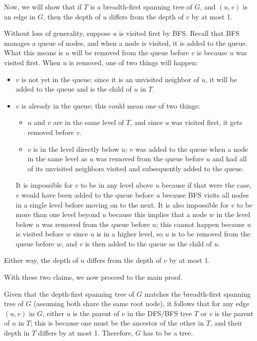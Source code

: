 \documentclass{article}
\begin{document}
\begin{enumerate}
Now, we will show that if $T$ is a breadth-first spanning tree of $G$, and $(u, v)$ is an edge in $G$, then the depth of $u$ differs from the depth of $v$ by at most 1.

Without loss of generality, suppose $u$ is visited first by BFS. Recall that BFS manages a queue of nodes, and when a node is visited, it is added to the queue. What this means is $u$ will be removed from the queue before $v$ is because $u$ was visited first. When $u$ is removed, one of two things will happen:
\begin{itemize}
\item $v$ is not yet in the queue; since it is an unvisited neighbor of $u$, it will be added to the queue and is the child of $u$ in $T$.
\item $v$ is already in the queue; this could mean one of two things:
\begin{itemize}
\item $u$ and $v$ are in the same level of $T$, and since $u$ was visited first, it gets removed before $v$.
\item $v$ is in the level directly below $u$; $v$ was added to the queue when a node in the same level as $u$ was removed from the queue before $u$ and had all of its unvisited neighbors visited and subsequently added to the queue.
\end{itemize}
It is impossible for $v$ to be in any level above $u$ because if that were the case, $v$ would have been added to the queue before $u$ because BFS visits all nodes in a single level before moving on to the next. It is also impossible for $v$ to be more than one level beyond $u$ because this implies that a node $w$ in the level below $u$ was removed from the queue before $u$; this cannot happen because $u$ is visited before $w$ since $u$ is in a higher level, so $u$ is to be removed from the queue before $w$, and $v$ is then added to the queue as the child of $u$.
\end{itemize}
Either way, the depth of $u$ differs from the depth of $v$ by at most 1.

With these two claims, we now proceed to the main proof.

Given that the depth-first spanning tree of $G$ matches the breadth-first spanning tree of $G$ (assuming both share the same root node), it follows that for any edge $(u, v)$ in $G$, either $u$ is the parent of $v$ in the DFS/BFS tree $T$ or $v$ is the parent of $u$ in $T$; this is because one must be the ancestor of the other in $T$, and their depth in $T$ differs by at most 1. Therefore, $G$ has to be a tree.


\end{enumerate}
\end{document}
